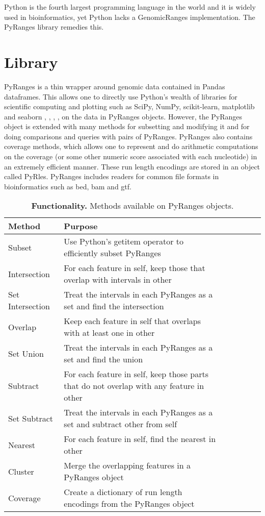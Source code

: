 \documentclass[10pt,letterpaper]{article}
\begin{document}
Python is the fourth largest programming language in the world and it is widely
used in bioinformatics, yet Python lacks a GenomicRanges implementation. The
PyRanges library remedies this.

\section*{Library}

PyRanges is a thin wrapper around genomic data contained in Pandas
\cite{mckinney-proc-scipy-2010} dataframes. This allows one to directly use
Python's wealth of libraries for scientific computing and plotting such as
SciPy, NumPy, scikit-learn, matplotlib and seaborn \cite{scipy},
\cite{oliphant-2006-guide}, \cite{scikit-learn}, \cite{Hunter:2007},
\cite{michael_waskom_2017_883859} on the data in PyRanges objects. However, the
PyRanges object is extended with many methods for subsetting and modifying it
and for doing comparisons and queries with pairs of PyRanges. PyRanges also
contains coverage methods, which allows one to represent and do arithmetic
computations on the coverage (or some other numeric score associated with each
nucleotide) in an extremely efficient manner. These run length encodings are
stored in an object called PyRles. PyRanges includes readers for common
file formats in bioinformatics such as bed, bam and gtf.

\begin{table}[!ht]
\begin{adjustwidth}{-1.5in}{0in}
\centering
\caption{{\bf Functionality.} Methods available on PyRanges objects.}
\begin{tabular}{|l|l|l|l|l|l|l|}
\hline
  {\bf Method} & {\bf Purpose} \\ \hline
  Subset & Use Python's getitem operator to efficiently subset PyRanges \\ \hline
  Intersection & For each feature in self, keep those that overlap with intervals in other \footnotemark \\ \hline
  Set Intersection & Treat the intervals in each PyRanges as a set and find the intersection \footnotemark \\ \hline
  Overlap & Keep each feature in self that overlaps with at least one in other \\ \hline
  Set Union & Treat the intervals in each PyRanges as a set and find the union \\ \hline
  Subtract & For each feature in self, keep those parts that do not overlap with any feature in other \\ \hline
  Set Subtract & Treat the intervals in each PyRanges as a set and subtract other from self \\ \hline
  Nearest & For each feature in self, find the nearest in other \\ \hline
  Cluster & Merge the overlapping features in a PyRanges object \\ \hline
  Coverage & Create a dictionary of run length encodings from the PyRanges object \\ \hline
\end{tabular}
\label{tab1}
\end{adjustwidth}
\end{table}
\end{document}
